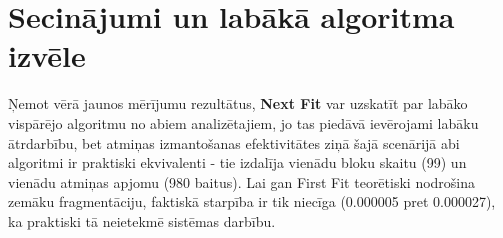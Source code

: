 \documentclass{report}
\begin{document}
	\section{Secinājumi un labākā algoritma izvēle}
	
	Ņemot vērā jaunos mērījumu rezultātus, \textbf{Next Fit} var uzskatīt par labāko vispārējo algoritmu no abiem analizētajiem, jo tas piedāvā ievērojami labāku ātrdarbību, bet atmiņas izmantošanas efektivitātes ziņā šajā scenārijā abi algoritmi ir praktiski ekvivalenti - tie izdalīja vienādu bloku skaitu (99) un vienādu atmiņas apjomu (980 baitus). Lai gan First Fit teorētiski nodrošina zemāku fragmentāciju, faktiskā starpība ir tik niecīga (0.000005 pret 0.000027), ka praktiski tā neietekmē sistēmas darbību.
	
\end{document}
